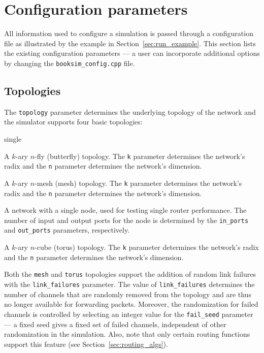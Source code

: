 \documentclass[11pt]{article}
\begin{document}
\section{Configuration parameters}
\label{sec:config_params}

All information used to configure a simulation is passed through a
configuration file as illustrated by the example in
Section~\ref{sec:run_example}.  This section lists the existing
configuration parameters --- a user can incorporate additional options
by changing the \texttt{booksim\_config.cpp} file.

\subsection{Topologies}
\label{sec:topos}

The \texttt{topology} parameter determines the underlying topology of the
network and the simulator supports four basic topologies:
\begin{opt_list}{single}
\item[fly] A $k$-ary $n$-fly (butterfly) topology. The \texttt{k}
parameter determines the network's radix and the \texttt{n} parameter
determines the network's dimension.

\item[mesh] A $k$-ary $n$-mesh (mesh) topology. The \texttt{k}
parameter determines the network's radix and the \texttt{n} parameter determines
the network's dimension.

\item[single] A network with a single node, used for testing single
router performance.  The number of input and output ports for the node
is determined by the \texttt{in\_ports} and \texttt{out\_ports} parameters,
respectively.

\item[torus] A $k$-ary $n$-cube (torus) topology.  The \texttt{k}
parameter determines the network's radix and the \texttt{n} parameter determines
the network's dimension.
\end{opt_list}

Both the \texttt{mesh} and \texttt{torus} topologies support the
addition of random link failures with the \texttt{link\_failures}
parameter.  The value of \texttt{link\_failures} determines the number
of channels that are randomly removed from the topology and are thus
no longer available for forwarding packets.  Moreover, the
randomization for failed channels is controlled by selecting an
integer value for the \texttt{fail\_seed} parameter --- a fixed seed
gives a fixed set of failed channels, independent of other
randomization in the simulation.  Also, note that only certain routing
functions support this feature (see Section~\ref{sec:routing_algs}).
\end{document}
